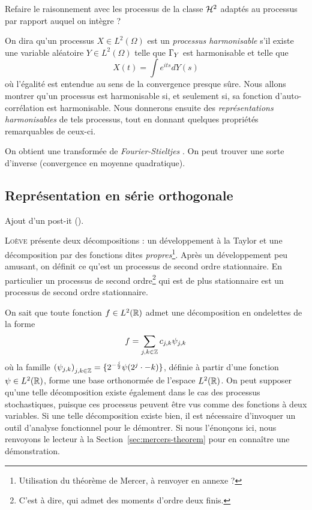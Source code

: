 \begin{question}
  Refaire le raisonnement avec les processus de la classe $\mathcal{H}^2$
  adaptés au processus par rapport auquel on intègre ?
\end{question}


On dira qu'un processus $X\in L^2(\Omega)$ est un \emph{processus
  harmonisable} s'il existe une variable aléatoire $Y\in L^2(\Omega)$
telle que $\Gamma_Y$ est harmonisable et telle que
\begin{equation}
  \label{eqn:rep-harm-proc}
  X(t) = \int e^{its} dY(s)
\end{equation}
où l'égalité est entendue au sens de la convergence presque sûre. Nous
allons montrer qu'un processus est harmonisable si, et seulement si,
sa fonction d'auto-corrélation est harmonisable. Nous donnerons
ensuite des \emph{représentations harmonisables} de tels processus,
tout en donnant quelques propriétés remarquables de ceux-ci.

\begin{alert}
  On obtient une \og transformée de \emph{Fourier-Stieltjes} \fg{}. On
  peut trouver une sorte d'inverse (convergence en moyenne
  quadratique).
\end{alert}

\subsection{Représentation en série orthogonale}

\begin{alert}
  Ajout d'un post-it (\cite[p.~143]{loeve1978}).
\end{alert}

\textsc{Loève} présente deux décompositions : un développement à la
Taylor et une décomposition par des fonctions dites
\emph{propres}\footnote{Utilisation du théorème de Mercer, à renvoyer
  en annexe ?}. Après un développement peu amusant, on définit ce
qu'est un processus de second ordre stationnaire. En particulier un
processus de second ordre\footnote{C'est à dire, qui admet des moments
  d'ordre deux finis.} qui est de plus stationnaire est un processus de
second ordre stationnaire.

On sait que toute fonction $f\in L^2(\mathbb{R})$ admet une décomposition en
ondelettes de la forme
\begin{equation*}
  f = \sum_{j,k\in\mathbb{Z}} c_{j,k}\psi_{j,k}
\end{equation*}
où la famille
${(\psi_{j,k})}_{j,k\in\mathbb{Z}} = \{2^{-\frac{j}{2}}\psi(2^j\cdot-k)\}$,
définie à partir d'une fonction $\psi\in L^2(\mathbb{R})$, forme une base
orthonormée de l'espace $L^2(\mathbb{R})$. On peut supposer qu'une telle
décomposition existe également dans le cas des processus
stochastiques, puisque ces processus peuvent être vus comme des
fonctions à deux variables. Si une telle décomposition existe bien, il
est nécessaire d'invoquer un outil d'analyse fonctionnel pour le
démontrer. Si nous l'énonçons ici, nous renvoyons le lecteur à la
Section~\ref{sec:mercers-theorem} pour en connaître une démonstration.


